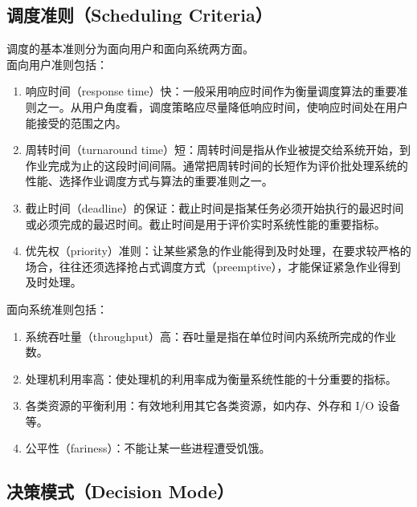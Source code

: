 \vspace{0.5cm}

\subsection{调度准则（Scheduling Criteria）}

调度的基本准则分为面向用户和面向系统两方面。\\

面向用户准则包括：

\begin{enumerate}
    \item 响应时间（response time）快：一般采用响应时间作为衡量调度算法的重要准则之一。从用户角度看，调度策略应尽量降低响应时间，使响应时间处在用户能接受的范围之内。

    \item 周转时间（turnaround time）短：周转时间是指从作业被提交给系统开始，到作业完成为止的这段时间间隔。通常把周转时间的长短作为评价批处理系统的性能、选择作业调度方式与算法的重要准则之一。

    \item 截止时间（deadline）的保证：截止时间是指某任务必须开始执行的最迟时间或必须完成的最迟时间。截止时间是用于评价实时系统性能的重要指标。

    \item 优先权（priority）准则：让某些紧急的作业能得到及时处理，在要求较严格的场合，往往还须选择抢占式调度方式（preemptive），才能保证紧急作业得到及时处理。
\end{enumerate}

面向系统准则包括：

\begin{enumerate}
    \item 系统吞吐量（throughput）高：吞吐量是指在单位时间内系统所完成的作业数。

    \item 处理机利用率高：使处理机的利用率成为衡量系统性能的十分重要的指标。

    \item 各类资源的平衡利用：有效地利用其它各类资源，如内存、外存和 I/O 设备等。

    \item 公平性（fariness）：不能让某一些进程遭受饥饿。
\end{enumerate}

\vspace{0.5cm}

\subsection{决策模式（Decision Mode）}

